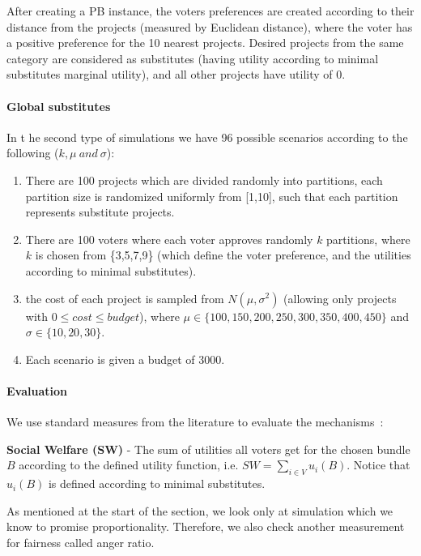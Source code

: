 \documentclass[runningheads]{llncs}
\begin{document}
After creating a PB instance, the voters preferences are created according to their distance from the projects (measured by Euclidean distance), where the voter has a positive preference for the 10 nearest projects. Desired projects from the same category are considered  as substitutes (having utility according to minimal substitutes marginal utility), and all other projects have utility of 0.


\paragraph{Global substitutes} In t he second type of simulations we have 96 possible scenarios according to the following ($k, \mu \ and\  \sigma$):


\begin{enumerate}
    \item There are 100 projects which are divided randomly into partitions, each partition size is randomized uniformly from [1,10], such that each partition represents substitute projects.
    
    \item There are 100 voters where each voter approves randomly $k$ partitions, where $k$ is chosen from \{3,5,7,9\} (which define the voter preference, and the utilities according to minimal substitutes). 
    
    \item the cost of each project is sampled from  $N(\mu,\sigma^2)$ (allowing only projects with $0\leq cost\leq budget$), where $\mu\in\{100,150,200,250,300,350,400,450\}$ and $\sigma\in\{10,20,30\}$.
    
    \item Each scenario is given a budget of 3000.
\end{enumerate}

\paragraph{Evaluation}

We use standard measures from the literature to evaluate the mechanisms~\cite{skowron2020participatory}:

\textbf{Social Welfare (SW)} - The sum of utilities all voters get for the chosen bundle $B$ according to the defined utility function, i.e. $SW = \sum_{i\in V}u_i(B)$. Notice that $u_i(B)$ is defined according to minimal substitutes.

As mentioned at the start of the section, we look only at simulation which we know to promise proportionality. Therefore, we also check another measurement for fairness called anger ratio.
\end{document}
